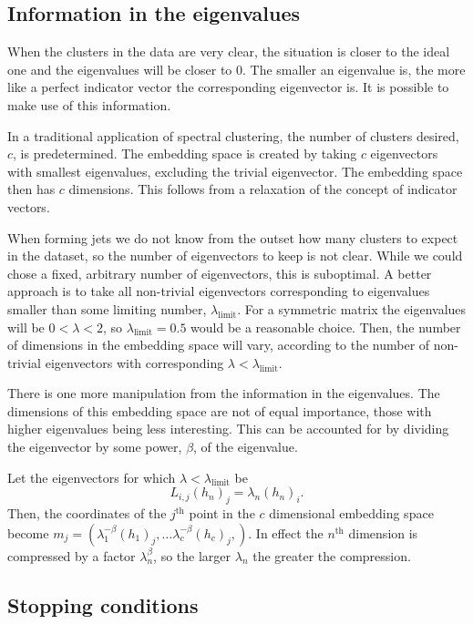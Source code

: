 \subsection{Information in the eigenvalues}\label{sec:eig_norm}
When the clusters in the data are very clear, the situation is closer to the ideal one and the eigenvalues will be closer to \(0\).
The smaller an eigenvalue is, the more like a perfect indicator vector the corresponding eigenvector is.
It is possible to make use of this information.

In a traditional application of spectral clustering, the number of clusters desired, \(c\), is predetermined.
The embedding space is created by taking \(c\) eigenvectors with smallest eigenvalues, excluding the trivial eigenvector.
The embedding space then has \(c\) dimensions.
This follows from a relaxation of the concept of indicator vectors.

When forming jets we do not know from the outset how many clusters to expect in the dataset,
so the number of eigenvectors to keep is not clear.
While we could chose a fixed, arbitrary number of eigenvectors, this is suboptimal.
A better approach is to take all non-trivial eigenvectors corresponding to eigenvalues
smaller than some limiting number, \(\lambda_\text{limit}\).
For a symmetric matrix the eigenvalues will be \(0 < \lambda < 2\),
so \(\lambda_\text{limit} = 0.5\) would be a reasonable choice.
Then, the number of dimensions in the embedding space will vary,
according to the number of non-trivial eigenvectors with corresponding \(\lambda < \lambda_\text{limit}\).

There is one more manipulation from the information in the eigenvalues.
The dimensions of this embedding space are not of equal importance,
those with higher eigenvalues being less interesting.
This can be accounted for by dividing the eigenvector by some power, \(\beta\), of the eigenvalue.

Let the eigenvectors for which \(\lambda < \lambda_\text{limit}\) be
\begin{equation}
    L_{i, j} (h_n)_j = \lambda_n (h_n)_i.
\end{equation}
Then, the coordinates of the \(j^\text{th}\) point in the \(c\) dimensional embedding space
become \(m_j = \left(\lambda_1^{-\beta} (h_1)_j, \dots \lambda_c^{-\beta} (h_c)_j,\right)\).
In effect the \(n^\text{th}\) dimension is compressed by a factor \(\lambda_n^\beta\),
so the larger \(\lambda_n\) the greater the compression.

\subsection{Stopping conditions}\label{sec:stopping_condintion}

